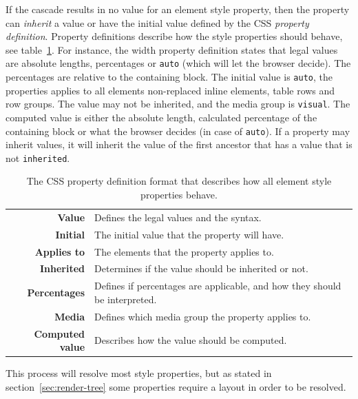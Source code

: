 \documentclass[a4paper,11pt]{kth-mag}
\newcommand{\code}[1]{\texttt{#1}}
\begin{document}
        If the cascade results in no value for an \gls{element} style property, then the property can \emph{inherit} a value or have the initial value defined by the \gls{CSS} \emph{property definition}.
        Property definitions describe how the style properties should behave, see table~\ref{table:css_property_definition}.
        For instance, the width property definition states that legal values are absolute lengths, percentages or \code{auto} (which will let the \gls{browser} decide).
        The percentages are relative to the containing block.
        The initial value is \code{auto}, the properties applies to all \glspl{element} non-replaced inline \glspl{element}, table rows and row groups.
        The value may not be inherited, and the media group is \code{visual}.
        The computed value is either the absolute length, calculated percentage of the containing block or what the \gls{browser} decides (in case of \code{auto}).
        If a property may inherit values, it will inherit the value of the first ancestor that has a value that is not \code{inherited}.

        \begin{table}[ht]\center
          \tiny
          \begin{tabular}[t]{ r | l }
            \textbf{Value} & Defines the legal values and the syntax. \\
            \textbf{Initial} & The initial value that the property will have. \\
            \textbf{Applies to} & The \glspl{element} that the property applies to. \\
            \textbf{Inherited} & Determines if the value should be inherited or not. \\
            \textbf{Percentages} & Defines if percentages are applicable, and how they should be interpreted. \\
            \textbf{Media} & Defines which media group the property applies to. \\
            \textbf{Computed value} & Describes how the value should be computed. \\
          \end{tabular}
          \caption{The \gls{CSS} property definition format that describes how all \gls{element} style properties behave.}
          \label{table:css_property_definition}
        \end{table}

        This process will resolve most style properties, but as stated in section~\ref{sec:render-tree} some properties require a layout in order to be resolved.
\end{document}
